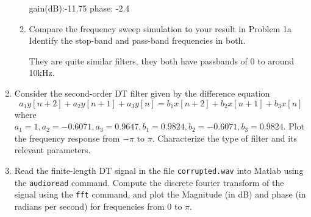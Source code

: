 \documentclass{article}
\begin{document}
\begin{enumerate}
\begin{enumerate}
\begin{center}
            gain(dB):-11.75 phase: -2.4
        \end{center}
        \item Compare the frequency sweep simulation to your result in Problem 1a Identify the stop-band and pass-band frequencies in both.
        \begin{center}
            They are quite similar filters, they both have passbands of 0 to around 10kHz.
        \end{center}
    \end{enumerate}
    \newpage
    \item Consider the second-order DT filter given by the difference equation
    \begin{equation}
        a_1y[n+2]+a_2y[n+1]+a_3y[n] = b_1x[n+2]+b_2x[n+1]+b_3x[n]
    \end{equation}
    where $a_1 = 1, a_2 = -0.6071, a_3 = 0.9647, b_1 = 0.9824, b_2 = -0.6071, b_3 = 0.9824.$ Plot the frequency response from $-\pi\text{ to }\pi$. Characterize the type of filter and its relevant parameters.
    \begin{center}
    \end{center}
    \item Read the finite-length DT signal in the file \texttt{corrupted.wav} into Matlab using the \texttt{audioread} command. Compute the discrete fourier transform of the signal using the \texttt{fft} command, and plot the Magnitude (in dB) and phase (in radians per second) for frequencies from 0 to $\pi$.
    \begin{center}

\end{center}
\end{enumerate}
\end{document}
